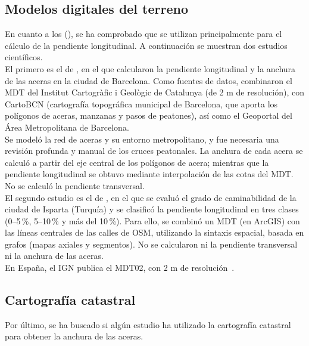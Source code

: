 \subsection{Modelos digitales del terreno}
En cuanto a los  (), se ha comprobado que se utilizan principalmente para el cálculo de la pendiente longitudinal. A continuación se muestran dos estudios científicos.
\\

El primero es el de \textcite{vallsclua2023}, en el que calcularon la pendiente longitudinal y la anchura de las aceras en la ciudad de Barcelona. Como fuentes de datos, combinaron el \gls{MDT} del Institut Cartogràfic i Geològic de Catalunya (de 2 m de resolución), con CartoBCN (cartografía topográfica municipal de Barcelona, que aporta los polígonos de aceras, manzanas y pasos de peatones), así como el Geoportal del Área Metropolitana de Barcelona.
\\

Se modeló la red de aceras y su entorno metropolitano, y fue necesaria una revisión profunda y manual de los cruces peatonales. La anchura de cada acera se calculó a partir del eje central de los polígonos de acera; mientras que la pendiente longitudinal se obtuvo mediante interpolación de las cotas del \gls{MDT}. No se calculó la pendiente transversal.
\\

El segundo estudio es el de \textcite{cetin2026}, en el que se evaluó el grado de caminabilidad de la ciudad de Isparta (Turquía) y se clasificó la pendiente longitudinal en tres clases (0--5\,\%, 5--10\,\% y más del 10\,\%). Para ello, se combinó un \gls{MDT} (en ArcGIS) con las líneas centrales de las calles de \gls{OSM}, utilizando la sintaxis espacial, basada en grafos (mapas axiales y segmentos). No se calcularon ni la pendiente transversal ni la anchura de las aceras.
\\

En España, el \gls{IGN} publica el MDT02, con 2 m de resolución~\parencite{pnoa_mdt}.
\\

\subsection{Cartografía catastral}
Por último, se ha buscado si algún estudio ha utilizado la cartografía catastral para obtener la anchura de las aceras.
\\


